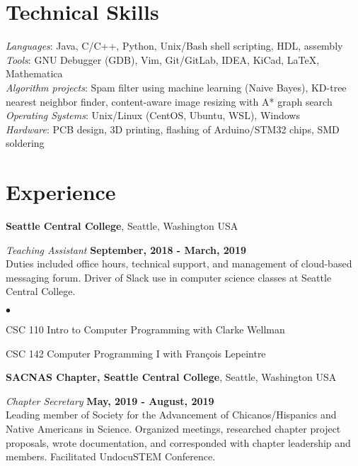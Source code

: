 \documentclass[margin,line]{res}
\newenvironment{list2}{
  \begin{list}{$\bullet$}{%
      \setlength{\itemsep}{0in}
      \setlength{\parsep}{0in} \setlength{\parskip}{0in}
      \setlength{\topsep}{0in} \setlength{\partopsep}{0in} 
      \setlength{\leftmargin}{0.2in}}}{\end{list}}
\begin{document}
\begin{resume}
\vspace{-.2cm}
\section{\sc Technical Skills} 
	{\em Languages}:  
	Java, C/C++, Python, Unix/Bash shell scripting, HDL, assembly
	\\
	{\em Tools}:  
	GNU Debugger (GDB), Vim, Git/GitLab, IDEA, KiCad, \LaTeX, Mathematica 
	\\
	{\em Algorithm projects}: 
	Spam filter using machine learning (Naive Bayes), KD-tree
	nearest neighbor finder, content-aware image resizing with A* graph search
	\\
	{\em Operating Systems}:  
	Unix/Linux (CentOS, Ubuntu, WSL), Windows
	\\
	{\em Hardware}:  PCB design, 3D printing, flashing of Arduino/STM32 chips, SMD soldering
	\\


\vspace{-.3cm}
\section{\sc Experience}


{\bf Seattle Central College}, Seattle, Washington USA

\vspace{-.3cm}
{\em Teaching Assistant} \hfill {\bf September, 2018  - March, 2019}\\
Duties included office hours, technical support, and management of cloud-based messaging forum. 
  Driver of Slack use in computer science classes at Seattle Central College.
\begin{list2}
\item CSC 110 Intro to Computer Programming with Clarke Wellman
\item CSC 142 Computer Programming I with François Lepeintre
\end{list2}     

{\bf SACNAS Chapter, Seattle Central College}, Seattle, Washington USA

\vspace{-.3cm}
{\em Chapter Secretary} \hfill {\bf May, 2019 - August, 2019}\\
Leading member of Society for the Advancement of Chicanos/Hispanics and Native Americans in Science.
  Organized meetings, researched chapter project proposals, wrote documentation, and 
  corresponded with chapter leadership and members. Facilitated UndocuSTEM Conference.

\end{resume}
\end{document}
